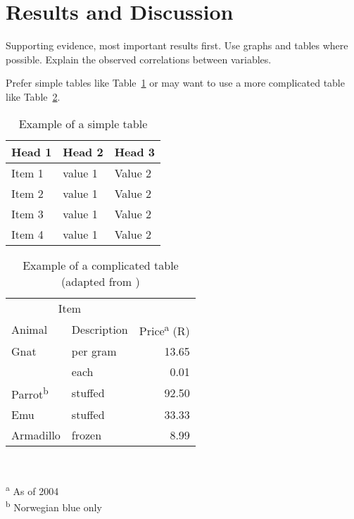\documentclass[a4paper,12pt]{article}
\begin{document}
\section{Results and Discussion}
Supporting evidence, most important results first. Use graphs and tables where possible. Explain the observed correlations between variables.

Prefer simple tables like Table~\ref{tab:simpletabexample} or may want to use a
more complicated table like Table~\ref{tab:tabexample}.
\begin{table}[htbp]
  \centering
  \caption{Example of a simple table}
  \label{tab:simpletabexample}
  \begin{tabular}{lll}
    \toprule
    Head 1 & Head 2& Head 3 \\
    \midrule
    Item 1 & value 1 & Value 2 \\
    Item 2 & value 1 & Value 2 \\
    Item 3 & value 1 & Value 2 \\
    Item 4 & value 1 & Value 2 \\
    \bottomrule
  \end{tabular}
\end{table}

\begin{table}[htbp]
  \centering
  \caption[Short caption for table of tables]{Example of a complicated table (adapted from \citet{fear})}
  \label{tab:tabexample}
  \begin{minipage}{0.5\textwidth}
    \begin{centering}
      \begin{tabular}{@{}llr@{}} \toprule 
        \multicolumn{2}{c}{Item}                                               \\ 
        \cmidrule(r){1-2} 
        Animal                    & Description & Price\textsuperscript{a} (R) \\ 
        \midrule 
        Gnat                      & per gram    & \num{13.65}                  \\ 
                                  & each        & \num{0.01}                   \\ 
        Parrot\textsuperscript{b} & stuffed     & \num{92.50}                  \\ 
        Emu                       & stuffed     & \num{33.33}                  \\ 
        Armadillo                 & frozen      & \num{8.99}                   \\ 
        \bottomrule 
      \end{tabular}                                                            \\
    \end{centering} 
    \vspace{1em}
    \textsuperscript{a} As of 2004                                             \\
    \textsuperscript{b} Norwegian blue only
  \end{minipage}
\end{table}
\end{document}
